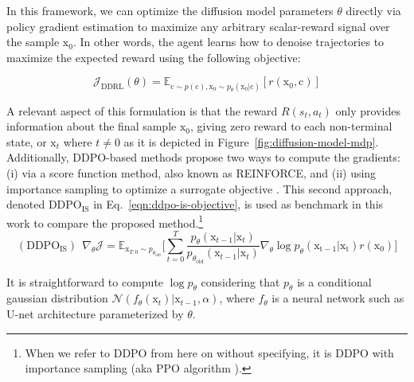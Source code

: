\noindent In this framework, we can optimize the diffusion
model parameters $\theta$ directly via policy
gradient estimation to maximize any arbitrary
scalar-reward signal over the sample $\mathrm{x}_{0}$.
In other words, the agent learns how to denoise trajectories to maximize the expected reward using the following objective:

\begin{equation}\label{difusion-rl-objective-1}
  \mathcal{J}_{\text{DDRL}}(\theta)
  = \mathbb{E}_{\mathrm{c}\sim p(\mathrm{c}),  \mathrm{x}_{0}\sim p_{\theta}(\mathrm{x}_{0}|\mathrm{c})}[ r(\mathrm{x}_{0}, \mathrm{c})]
\end{equation}

\noindent A relevant aspect of this formulation is that the reward $R(s_{t}, a_{t})$
only provides information about the final sample $\mathrm{x}_{0}$, giving zero
reward to each non-terminal state, or $\mathrm{x}_{t}$ where $t\neq0$ as it is
depicted in Figure~\ref{fig:diffusion-model-mdp}. Additionally, DDPO-based methods propose two ways to compute the gradients: (i) via a score function method, also known as REINFORCE, and (ii) using importance sampling to optimize a surrogate objective \cite{schulman2015trust, schulman2017proximal}. This second approach, denoted $\text{DDPO}_{\text{IS}}$ in Eq.~\eqref{eqn:ddpo-is-objective}, is used as benchmark in this work to compare the proposed method.\footnote{When we refer to DDPO from here on without specifying, it is DDPO with importance sampling (aka PPO algorithm \citep{schulman2017proximal}).} 
\begin{equation}\label{eqn:ddpo-is-objective}
  (\text{DDPO}_{\text{IS}})~~ \nabla_{\theta}\mathcal{J} = \mathbb{E}_{\mathrm{x}_{T:0}\sim p_{\theta_{\text{old}}}} \bigg[\sum_{t=0}^{T}\frac{p_{\theta}(\mathrm{x}_{t-1}|\mathrm{x}_{t})}{p_{\theta_{\text{old}}}(\mathrm{x}_{t-1}|\mathrm{x}_{t})}\nabla_{\theta}\log p_{\theta}(\mathrm{x_{t-1}|\mathrm{x}_t}) r(\mathrm{x}_{0})\bigg]
\end{equation}

\noindent It is straightforward to compute $\log p_{\theta}$ considering that
$p_{\theta}$ is a conditional gaussian distribution 
$\mathcal{N}(f_{\theta}(\mathrm{x}_{t}) | \mathrm{x}_{t-1}, \alpha)$, where
$f_{\theta}$ is a neural network such as U-net architecture parameterized by $\theta$. 

